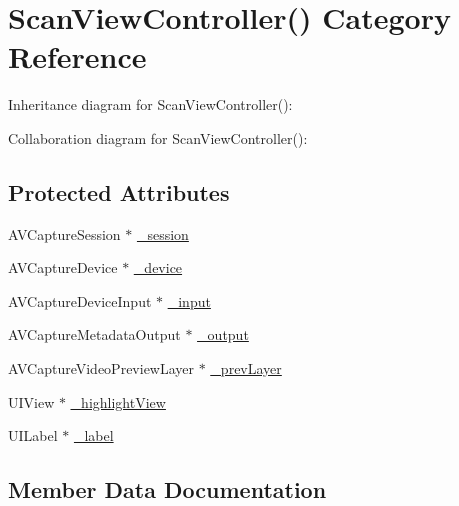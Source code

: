 \hypertarget{category_scan_view_controller_07_08}{}\section{Scan\+View\+Controller() Category Reference}
\label{category_scan_view_controller_07_08}


Inheritance diagram for Scan\+View\+Controller()\+:


Collaboration diagram for Scan\+View\+Controller()\+:
\subsection*{Protected Attributes}
\begin{DoxyCompactItemize}
\item 
A\+V\+Capture\+Session $\ast$ \hyperlink{category_scan_view_controller_07_08_aaa4b54d43d608a14daff099ca2b5e890}{\+\_\+session}
\item 
A\+V\+Capture\+Device $\ast$ \hyperlink{category_scan_view_controller_07_08_a8b405bf0c7038a049b8f06da863181f3}{\+\_\+device}
\item 
A\+V\+Capture\+Device\+Input $\ast$ \hyperlink{category_scan_view_controller_07_08_a13d525b2d8534c27560147b3415080ea}{\+\_\+input}
\item 
A\+V\+Capture\+Metadata\+Output $\ast$ \hyperlink{category_scan_view_controller_07_08_a458e5f4f769b551dda293364db849e40}{\+\_\+output}
\item 
A\+V\+Capture\+Video\+Preview\+Layer $\ast$ \hyperlink{category_scan_view_controller_07_08_aae6661ab8758207b3b8a9b39ed9a5edd}{\+\_\+prev\+Layer}
\item 
U\+I\+View $\ast$ \hyperlink{category_scan_view_controller_07_08_a75a7b0ae5ed591056f8a3d351fb35d10}{\+\_\+highlight\+View}
\item 
U\+I\+Label $\ast$ \hyperlink{category_scan_view_controller_07_08_a9c46ee545352636c2e8b649a106f7eda}{\+\_\+label}
\end{DoxyCompactItemize}


\subsection{Member Data Documentation}
\hypertarget{category_scan_view_controller_07_08_a8b405bf0c7038a049b8f06da863181f3}{}
